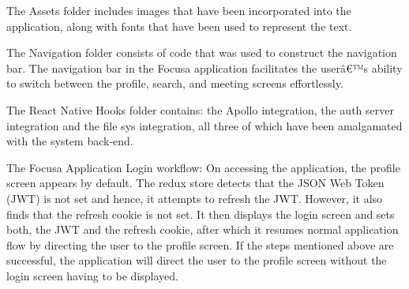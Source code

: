 The Assets folder includes images that have been incorporated into the application, along with fonts that have been used to represent the text.

The Navigation folder consists of code that was used to construct the navigation bar. The navigation bar in the Focusa application facilitates the userâ€™s ability to switch between the profile, search, and meeting screens effortlessly.

The React Native Hooks folder contains: the Apollo integration, the auth server integration and the file sys integration, all three of which have been amalgamated with the system back-end.


The Focusa Application Login workflow:
On accessing the application, the profile screen appears by default. The redux store detects that the JSON Web Token (JWT) is not set and hence, it attempts to refresh the JWT. However, it also finds that the refresh cookie is not set. It then displays the login screen and sets both, the JWT and the refresh cookie, after which it resumes normal application flow by directing the user to the profile screen.
If the steps mentioned above are successful, the application will direct the user to the profile screen without the login screen having to be displayed.